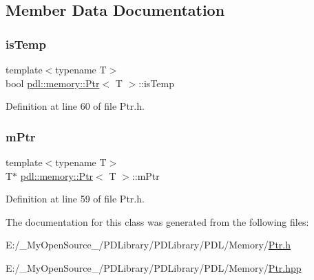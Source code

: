 \subsection{Member Data Documentation}
\mbox{\label{classpdl_1_1memory_1_1_ptr_ac66f80e55b55014adb1c843a2417c96c}} 
\subsubsection{\texorpdfstring{isTemp}{isTemp}}
{\footnotesize\ttfamily template$<$typename T$>$ \\
bool \mbox{\hyperlink{classpdl_1_1memory_1_1_ptr}{pdl\+::memory\+::\+Ptr}}$<$ T $>$\+::is\+Temp\hspace{0.3cm}{\ttfamily [private]}}



Definition at line 60 of file Ptr.\+h.

\mbox{\label{classpdl_1_1memory_1_1_ptr_a0e3ce5a9d122b322ac2b6f24767bbbd5}} 
\subsubsection{\texorpdfstring{mPtr}{mPtr}}
{\footnotesize\ttfamily template$<$typename T$>$ \\
T$\ast$ \mbox{\hyperlink{classpdl_1_1memory_1_1_ptr}{pdl\+::memory\+::\+Ptr}}$<$ T $>$\+::m\+Ptr\hspace{0.3cm}{\ttfamily [private]}}



Definition at line 59 of file Ptr.\+h.



The documentation for this class was generated from the following files\+:\begin{DoxyCompactItemize}
\item 
E\+:/\+\_\+\+My\+Open\+Source\+\_\+/\+P\+D\+Library/\+P\+D\+Library/\+P\+D\+L/\+Memory/\mbox{\hyperlink{_ptr_8h}{Ptr.\+h}}\item 
E\+:/\+\_\+\+My\+Open\+Source\+\_\+/\+P\+D\+Library/\+P\+D\+Library/\+P\+D\+L/\+Memory/\mbox{\hyperlink{_ptr_8hpp}{Ptr.\+hpp}}\end{DoxyCompactItemize}
